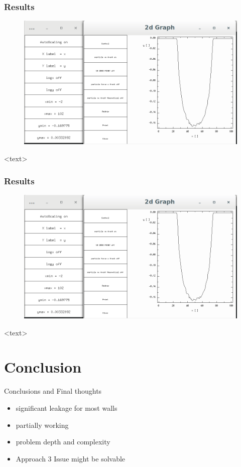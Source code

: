\documentclass{beamer}
\begin{document}
\begin{frame}
\frametitle{Results}
\begin{figure}
\includegraphics[scale=0.2]{A2p3}
\caption{}
\end{figure}
<text>
\end{frame}

\begin{frame}
\frametitle{Results}
\begin{figure}
\includegraphics[scale=0.2]{A2p3}
\caption{}
\end{figure}
<text>
\end{frame}
\section{Conclusion}
\begin{frame}{Conclusions and Final thoughts}

\begin{itemize}
  \item significant leakage for most walls
  \item partially working
  \item problem depth and complexity
  \item Approach 3 Issue might be solvable   
\end{itemize}

\vskip 1cm

\end{frame}
\end{document}
